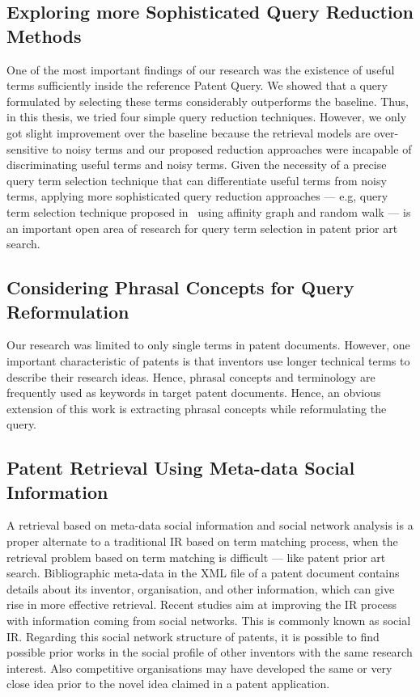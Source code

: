 \subsection{Exploring more Sophisticated Query Reduction Methods}
\label{subsec:SophisticatedQueryReduction}
One of the most important findings of our research was the existence of useful terms sufficiently inside the reference Patent Query. 
We showed that a query formulated by selecting these terms considerably outperforms the baseline. 
Thus, in this thesis, we tried four simple query reduction techniques. However, we only got slight improvement over the baseline because the retrieval models are over-sensitive to noisy terms and our proposed reduction approaches were incapable of discriminating useful terms and noisy terms. 
Given the necessity of a precise query term selection technique that can differentiate useful terms from noisy terms, 
applying more sophisticated query reduction approaches --- e.g, query term selection technique proposed in~\citep{maxwell2013compact} using affinity graph and random walk --- is an important open area of research for query term selection in patent prior art search.     

\subsection{Considering Phrasal Concepts for Query Reformulation }
\label{subsec: PhraseAnalysis}
Our research was limited to only single terms in patent documents. 
However, one important characteristic of patents is that 
inventors use longer technical terms to describe their research ideas. 
Hence, phrasal concepts and terminology 
are frequently used as keywords in target patent documents.
Hence, an obvious extension of this work is extracting phrasal concepts while reformulating the query. 

\subsection{Patent Retrieval Using Meta-data Social Information}
\label{subsec: Meta-dataNetworkAnalysis}
A retrieval based on meta-data social information and social network analysis 
is a proper alternate to a traditional IR based on term matching process, 
when the retrieval problem based on term matching is difficult --- like patent prior art search.  
Bibliographic meta-data in the XML file of a patent document contains details about 
its inventor, organisation, and other information, which can give rise in more effective retrieval. 
Recent studies aim at improving the IR process with
information coming from social networks. This is commonly known as social IR. 
Regarding this social network structure of patents, it is possible to 
find possible prior works in the social profile of other inventors with the same research interest.
Also competitive organisations may have developed the same or very close idea prior to the novel 
idea claimed in a patent application.


